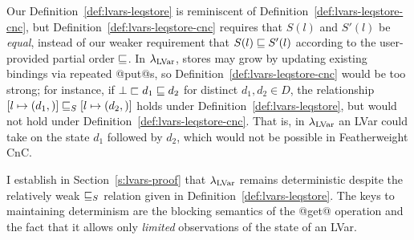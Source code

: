 Our Definition~\ref{def:lvars-leqstore} is reminiscent of
Definition~\ref{def:lvars-leqstore-cnc}, but
Definition~\ref{def:lvars-leqstore-cnc} requires that $S(l)$ and
$S'(l)$ be \emph{equal}, instead of our weaker requirement that $S(l)
\sqsubseteq S'(l)$ according to the user-provided partial order
$\sqsubseteq$.  In $\lambda_{\textrm{LVar}}$, stores may grow by updating existing
bindings via repeated @put@s, so
Definition~\ref{def:lvars-leqstore-cnc} would be too strong; for
instance, if $\bot \sqsubset d_1 \sqsubseteq d_2$ for distinct $d_1, d_2
\in D$, the relationship
$\left[ l \mapsto (d_1, \right)] \sqsubseteq_S \left[ l \mapsto (d_2, \right)]$
holds under Definition~\ref{def:lvars-leqstore}, but would not hold
under Definition~\ref{def:lvars-leqstore-cnc}.  That is, in
$\lambda_{\textrm{LVar}}$ an LVar could take on the state $d_1$ followed by $d_2$,
which would not be possible in Featherweight CnC.

I establish in Section~\ref{s:lvars-proof} that $\lambda_{\textrm{LVar}}$ remains
deterministic despite the relatively weak $ \sqsubseteq_S $ relation
given in Definition~\ref{def:lvars-leqstore}.  The keys to maintaining
determinism are the blocking semantics of the @get@ operation and the
fact that it allows only \emph{limited} observations of the state of
an LVar.
